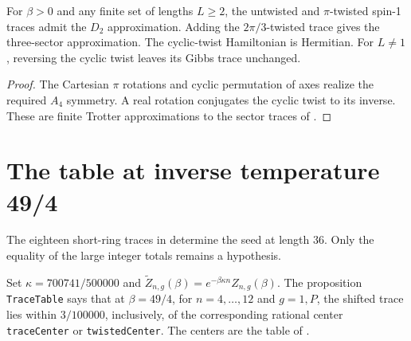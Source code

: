 \begin{lemma}
  \label{lem:spin1-sectors}
  \leanok
  For \(\beta>0\) and any finite set of lengths \(L\ge2\), the untwisted and \(\pi\)-twisted
  spin-1 traces admit the \(D_2\) approximation.
  Adding the \(2\pi/3\)-twisted trace gives the three-sector approximation.
  The cyclic-twist Hamiltonian is Hermitian. For \(L\ne1\), reversing the cyclic twist leaves
  its Gibbs trace unchanged.
\end{lemma}
\begin{proof}
  \leanok
  The Cartesian \(\pi\) rotations and cyclic permutation of axes realize the required \(A_4\)
  symmetry. A real rotation conjugates the cyclic twist to its inverse.
  These are finite Trotter approximations to the sector traces of
  \cite[Sections 3 and 5.1]{OpenAIHaldane}.
\end{proof}

\section{The table at inverse temperature 49/4}

The eighteen short-ring traces in \cite[Appendix B]{OpenAIHaldane} determine the seed at
length \(36\). Only the equality of the large integer totals remains a hypothesis.

\begin{definition}
  \label{def:spin1-table36}
  \leanok
  Set \(\kappa=700741/500000\) and \(\widetilde Z_{n,g}(\beta)=e^{-\beta\kappa n}Z_{n,g}(\beta)\).
  The proposition \texttt{TraceTable} says that at \(\beta=49/4\), for \(n=4,\ldots,12\) and
  \(g=1,P\), the shifted trace lies within \(3/100000\), inclusively, of the corresponding
  rational center \texttt{traceCenter} or \texttt{twistedCenter}.
  The centers are the table of \cite[Lemma 5.1]{OpenAIHaldane}.
\end{definition}

